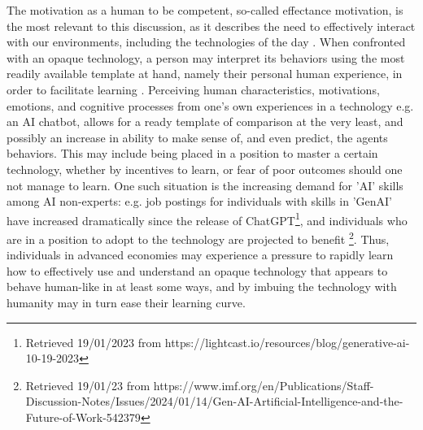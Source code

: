 \documentclass{article}
\theoremstyle{plain}
\theoremstyle{definition}
\theoremstyle{remark}
\begin{document}
The motivation as a human to be competent, so-called effectance motivation, is the most relevant to this discussion, as it describes the need to effectively interact with our environments, including the technologies of the day \cite{epley2007seeing}. When confronted with an opaque technology, a person may interpret its behaviors using the most readily available template at hand, namely their personal human experience, in order to facilitate learning \cite{epley2007seeing, waytz2010social}. Perceiving human characteristics, motivations, emotions, and cognitive processes from one's own experiences in a technology e.g. an AI chatbot, allows for a ready template of comparison at the very least, and possibly an increase in ability to make sense of, and even predict, the agents behaviors. This may include being placed in a position to master a certain technology, whether by incentives to learn, or fear of poor outcomes should one not manage to learn. One such situation is the increasing demand for 'AI' skills among AI non-experts: e.g. job postings for individuals with skills in 'GenAI' have increased dramatically since the release of ChatGPT\footnote{Retrieved 19/01/2023 from https://lightcast.io/resources/blog/generative-ai-10-19-2023}, and individuals who are in a position to adopt to the technology are projected to benefit \footnote{Retrieved 19/01/23 from https://www.imf.org/en/Publications/Staff-Discussion-Notes/Issues/2024/01/14/Gen-AI-Artificial-Intelligence-and-the-Future-of-Work-542379}. Thus, individuals in advanced economies may experience a pressure to rapidly learn how to effectively use and understand an opaque technology that appears to behave human-like in at least some ways, and by imbuing the technology with humanity may in turn ease their learning curve. 
\end{document}
